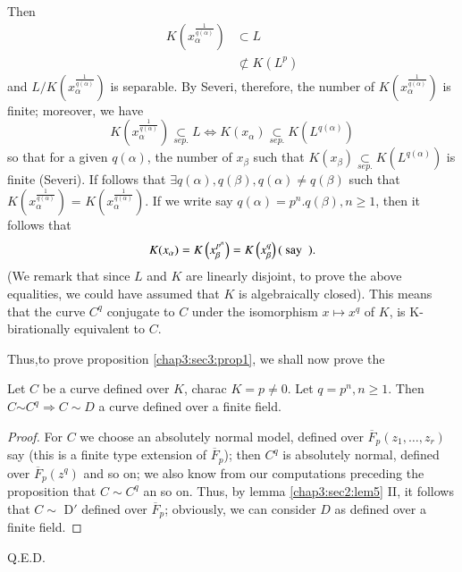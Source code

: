 Then
\begin{align*}
  K\left(x_{\alpha}^\frac{1}{q(\alpha)}\right) & \subset L\\ 
  &\not\subset K(L^{p})
 \end{align*}
 and $L/K\left(x_{\alpha}^\frac{1}{q(\alpha)}\right)$ is separable. By
 Severi, therefore, the number of\break
 $K\left(x_{\alpha}^\frac{1}{q(\alpha)}\right)$ 
 is finite; moreover, we have 
  $$ 
 {K\left(x_{\alpha}^\frac{1}{q(\alpha)}\right)
   \underset{sep.}{\subset} L \Longleftrightarrow K(x_{\alpha})
   \underset{sep.}{\subset} K(L^{q(\alpha)})} 
  $$
so that for a given $q(\alpha)$, the number of $x_{\beta}$ such that
$K(x_\beta){\underset{sep.}{\subset}K(L^{q(\alpha)})}$ is finite
(Severi). If follows that $\exists q(\alpha),q(\beta),q(\alpha) \neq
q(\beta)$ such that $K \left(x_{\alpha}^\frac{1}{q(\alpha)}\right)$  =
$K\left(x_{\alpha}^\frac{1}{q(\alpha)}\right)$. If we write say $q(\alpha) =
p^n.q(\beta), n\geq 1$, then it follows that  
$$
{K(x_{\alpha}) = K \left(x^{p^n}_{\beta}\right) =
  K\left(x^{q}_{\beta}\right)\text{(\text { say } )}.} 
$$
(We remark that since $L$ and $K$ are linearly disjoint, to prove the
above equalities, we could have assumed that $K$ is algebraically
closed). This means that the curve $C^q$ conjugate to $C$ under the
isomorphism $x  \mapsto x^q$ of $K$, is K-birationally equivalent to
$C$. 

Thus,\pageoriginale to prove proposition \ref{chap3:sec3:prop1}, we shall now prove the 

\begin{proposition}\label{chap3:sec3:prop2}%
  Let $C$ be a curve defined over $K$, charac $K = p \neq  0$. Let $q
  = p{^n, n\geq 1}$. Then $C {\sim C^q \Rightarrow C \sim D}$ a curve
  defined over a finite field. 
\end{proposition}

\begin{proof}%
  For $C$ we choose an absolutely normal model, defined over\break 
  $\overline{{F}}_p (z_1,\ldots,z_r)$ say (this is a finite type
  extension of $\overline{{F}}_p $); then $C^q$ is absolutely normal,
  defined over $\overline{{F}}_p (z^q)$ and so on; we also know from
  our computations preceding the proposition that $C \sim C^q$ an so
  on. Thus, by lemma \ref{chap3:sec2:lem5} II, it follows that $C \sim $
  D$'$ defined over $\overline{{F}}_p$; obviously, we can consider $D$
  as defined over a finite field. 
\end{proof}

\hfill{Q.E.D.}

